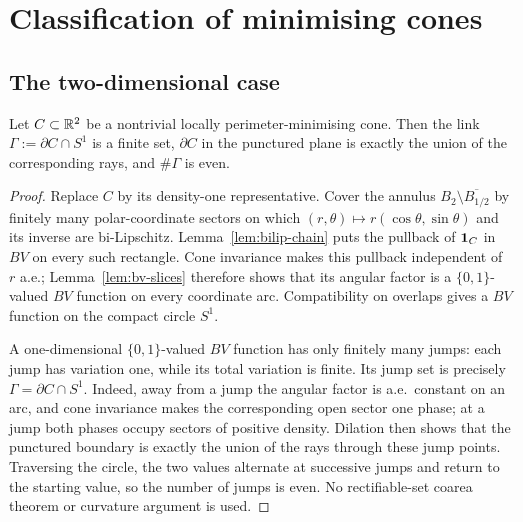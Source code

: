 \chapter{Classification of minimising cones}\label{ch:cones}

\section{The two-dimensional case}

\begin{lemma}\label{lem:cone-2d-link}
Let $C\subset\mathbb R^2$ be a nontrivial locally perimeter-minimising cone.  Then
the link $\Gamma:=\partial C\cap S^1$ is a finite set, $\partial C$ in the
punctured plane is exactly the union of the corresponding rays, and
$\#\Gamma$ is even.
\end{lemma}

\begin{proof}
Replace $C$ by its density-one representative.  Cover the annulus
$B_2\setminus\overline{B_{1/2}}$ by finitely many polar-coordinate sectors on
which $(r,\theta)\mapsto r(\cos\theta,\sin\theta)$ and its inverse are
bi-Lipschitz.  Lemma~\ref{lem:bilip-chain} puts the pullback of $\mathbf 1_{C}$ in
$BV$ on every such rectangle.  Cone invariance makes this pullback independent
of $r$ a.e.; Lemma~\ref{lem:bv-slices} therefore shows that its angular factor
is a $\{0,1\}$-valued $BV$ function on every coordinate arc.  Compatibility on
overlaps gives a $BV$ function on the compact circle $S^1$.

A one-dimensional $\{0,1\}$-valued $BV$ function has only finitely many jumps:
each jump has variation one, while its total variation is finite.  Its jump
set is precisely $\Gamma=\partial C\cap S^1$.  Indeed, away from a jump the
angular factor is a.e.\ constant on an arc, and cone invariance makes the
corresponding open sector one phase; at a jump both phases occupy sectors of
positive density.  Dilation then shows that the punctured boundary is exactly
the union of the rays through these jump points.  Traversing the circle, the
two values alternate at successive jumps and return to the starting value, so
the number of jumps is even.  No rectifiable-set coarea theorem or curvature
argument is used.
\end{proof}

